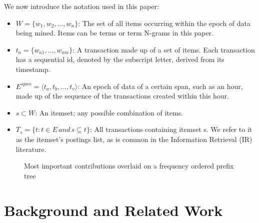 \documentclass[letterpaper,12pt,titlepage,oneside,final]{book}
\begin{document}
We now introduce the notation used in this paper:
\begin{itemize}
\item $W = \{w_1,w_2,\ldots, w_n\}$: The set of all items occurring within the epoch of data being mined. Items can be terms or term N-grams in this paper. %
\item $t_a = \{w_{a1},\ldots, w_{am}\}$: A transaction made up of a set of items. Each transaction has a sequential id, denoted by the subscript letter, derived from its timestamp.
\item $E^{span} = \langle t_a, t_b, \ldots, t_v\rangle$: An epoch of data of a certain span, such as an hour, made up of the sequence of the transactions created within this hour.
\item $s \subset W$: An itemset; any possible combination of items. 
\item $T_s = \{t: t \in E \, and \, s \subseteq t\}$: All transactions containing itemset s. We refer to it as the itemset's postings list, as is common in the Information Retrieval (IR) literature.
\end{itemize}



\begin{landscape}
\begin{figure}
\centering
{}
\caption{Most important contributions overlaid on a frequency ordered prefix tree}
\label{fig:outline}
\end{figure}
\end{landscape}






\chapter{Background and Related Work}
\label{sec:related}
\end{document}
